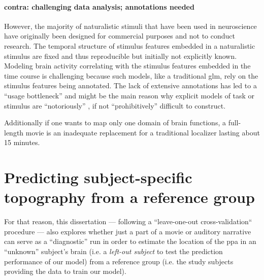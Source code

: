 \paragraph{contra: challenging data analysis; annotations needed}

%
However, the majority of naturalistic stimuli that have been used in
neuroscience have originally been designed for commercial purposes and not to
conduct research.
%
The temporal structure of stimulus features embedded in a naturalistic stimulus
are fixed and thus reproducible but initially not explicitly known.
%
Modeling brain activity correlating with the stimulus features embedded in the
time course is challenging \citep{saarimaki2021naturalistic, simony2020analysis}
because such models, like a traditional \ac{glm}, rely on the stimulus features
being annotated.
%
The lack of extensive annotations has led to a ``usage bottleneck''
\citep{aliko2020naturalistic} and might be the main reason why explicit models
of task or stimulus are ``notoriously'' \citep{richard2019fast}, if not
``prohibitively'' \citep{nastase2019measuring} difficult to construct.

%
Additionally if one wants to map only one domain of brain functions, a
full-length movie is an inadequate replacement for a traditional localizer
lasting about 15 minutes.



\section{Predicting subject-specific topography from a reference group}





%
For that reason, this dissertation --- following a ``leave-one-out
cross-validation`` procedure --- also explores whether just a part of a movie or
auditory narrative can serve as a ``diagnostic'' run in order to estimate the
location of the \ac{ppa} in an ``unknown'' subject's brain (i.e. a
\textit{left-out subject} to test the prediction performance of our model) from
a reference group (i.e. the study subjects providing the data to train our
model).

